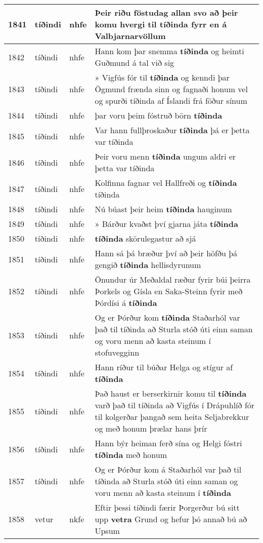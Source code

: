 \documentclass{article}
\begin{document}
\begin{longtable}{p{1cm}|p{1cm}|p{1cm}|p{13cm}}
\hline
1841&tíðindi&nhfe&Þeir riðu föstudag allan svo að þeir komu hvergi til \textbf{tíðinda} fyrr en á Valbjarnarvöllum\\
\hline
1842&tíðindi&nhfe&Hann kom þar snemma \textbf{tíðinda} og heimti Guðmund á tal við sig\\
\hline
1843&tíðindi&nhfe&» Vigfús fór til \textbf{tíðinda} og kenndi þar Ögmund frænda sinn og fagnaði honum vel og spurði tíðinda af Íslandi frá föður sínum\\
\hline
1844&tíðindi&nhfe&þar voru þeim fóstruð börn \textbf{tíðinda} \\
\hline
1845&tíðindi&nhfe&Var hann fullþroskaður \textbf{tíðinda} þá er þetta var tíðinda\\
\hline
1846&tíðindi&nhfe&Þeir voru menn \textbf{tíðinda} ungum aldri er þetta var tíðinda\\
\hline
1847&tíðindi&nhfe&Kolfinna fagnar vel Hallfreði og \textbf{tíðinda} tíðinda\\
\hline
1848&tíðindi&nhfe&Nú búast þeir heim \textbf{tíðinda} hauginum\\
\hline
1849&tíðindi&nhfe&» Bárður kvaðst því gjarna játa \textbf{tíðinda} \\
\hline
1850&tíðindi&nhfe& \textbf{tíðinda} skörulegastur að sjá\\
\hline
1851&tíðindi&nhfe&Hann sá þá bræður því að þeir höfðu þá gengið \textbf{tíðinda} hellisdyrunum\\
\hline
1852&tíðindi&nhfe&Önundur úr Meðaldal ræður fyrir búi þeirra Þorkels og Gísla en Saka-Steinn fyrir með Þórdísi á \textbf{tíðinda} \\
\hline
1853&tíðindi&nhfe&Og er Þórður kom \textbf{tíðinda} Staðarhól var það til tíðinda að Sturla stóð úti einn saman og voru menn að kasta steinum í stofuvegginn\\
\hline
1854&tíðindi&nhfe&Hann ríður til búðar Helga og stígur af \textbf{tíðinda} \\
\hline
1855&tíðindi&nhfe&Það haust er berserkirnir komu til \textbf{tíðinda} varð það til tíðinda að Vigfús í Drápuhlíð fór til kolgerðar þangað sem heita Seljabrekkur og með honum þrælar hans þrír\\
\hline
1856&tíðindi&nhfe&Hann býr heiman ferð sína og Helgi fóstri \textbf{tíðinda} með honum\\
\hline
1857&tíðindi&nhfe&Og er Þórður kom á Staðarhól var það til tíðinda að Sturla stóð úti einn saman og voru menn að kasta steinum í \textbf{tíðinda} \\
\hline
1858&vetur&nkfe&Eftir þessi tíðindi færir Þorgerður bú sitt upp \textbf{vetra} Grund og hefur þó annað bú að Upsum\\

\end{longtable}
\end{document}
